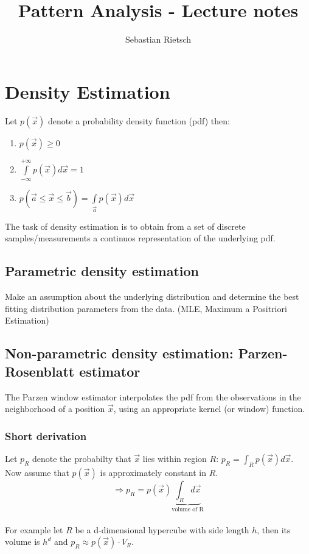 \documentclass{scrartcl}
\title{Pattern Analysis - Lecture notes}
\author{Sebastian Rietsch}
\begin{document}
\maketitle
\tableofcontents
\section{Density Estimation}
Let \(p(\vec{x})\) denote a probability density function (pdf) then:
\begin{enumerate}
    \item
        \(p(\vec{x}) \geq 0 \)
    \item
        \(\int\limits_{-\infty}^{+\infty} p(\vec{x}) d\vec{x} = 1 \)
    \item
        \(p(\vec{a} \leq \vec{x} \leq \vec{b}) = \int\limits_{\vec{a}} p(\vec{x}) d\vec{x} \)
\end{enumerate}
The task of density estimation is to obtain from a set of discrete samples/measurements a continuos representation of the underlying pdf.


\subsection{Parametric density estimation}
Make an assumption about the underlying distribution and determine the best fitting distribution parameters from the data. (MLE, Maximum a Positriori Estimation)

\subsection{Non-parametric density estimation: Parzen-Rosenblatt estimator}
The Parzen window estimator interpolates the pdf from the observations in the neighborhood of a position \(\vec{x}\), using an appropriate kernel (or window) function.

\subsubsection*{Short derivation}
Let \(p_R\) denote the probabilty that \(\vec{x}\) lies within region \(R\): \(p_R = \int_R p(\vec{x}) d\vec{x}\).\\
Now assume that \(p(\vec{x})\) is approximately constant in \(R\).
 \[\Rightarrow p_R = p(\vec{x}) \underbrace{\int_R d\vec{x}}_\text{volume of R}\]\\
For example let \(R\) be a d-dimensional hypercube with side length \(h\), then its volume is \(h^d\) and \(p_R \approx p(\vec{x}) \cdot V_R\).
\end{document}
